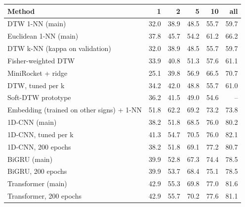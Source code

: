 \begin{tabular}{lrrrrr}
\toprule
Method & 1 & 2 & 5 & 10 & all \\
\midrule
DTW 1-NN (main) & 32.0 & 38.9 & 48.5 & 55.7 & 59.7 \\
Euclidean 1-NN (main) & 37.8 & 45.7 & 54.2 & 61.2 & 66.2 \\
DTW k-NN (kappa on validation) & 32.0 & 38.9 & 48.5 & 55.7 & 59.7 \\
Fisher-weighted DTW & 33.9 & 40.8 & 51.3 & 57.6 & 61.1 \\
MiniRocket + ridge & 25.1 & 39.8 & 56.9 & 66.5 & 70.7 \\
DTW, tuned per k & 34.2 & 42.0 & 48.8 & 55.7 & 61.0 \\
Soft-DTW prototype & 36.2 & 41.5 & 49.0 & 54.6 & -- \\
Embedding (trained on other signs) + 1-NN & 51.8 & 62.2 & 69.2 & 73.2 & 73.8 \\
1D-CNN (main) & 38.2 & 51.8 & 68.5 & 76.0 & 80.2 \\
1D-CNN, tuned per k & 41.3 & 54.7 & 70.5 & 76.0 & 82.1 \\
1D-CNN, 200 epochs & 38.2 & 51.8 & 69.1 & 77.2 & 80.7 \\
BiGRU (main) & 39.9 & 52.8 & 67.3 & 74.4 & 78.5 \\
BiGRU, 200 epochs & 39.9 & 53.7 & 68.4 & 75.1 & 78.5 \\
Transformer (main) & 42.9 & 55.3 & 69.8 & 77.0 & 81.6 \\
Transformer, 200 epochs & 42.9 & 55.7 & 70.2 & 77.6 & 81.1 \\
\bottomrule
\end{tabular}
